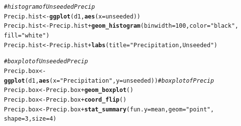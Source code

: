 \documentclass{article}\usepackage[]{graphicx}\usepackage[]{color}
\makeatletter
\newcommand{\hlnum}[1]{\textcolor[rgb]{0.686,0.059,0.569}{#1}}%
\newcommand{\hlstr}[1]{\textcolor[rgb]{0.192,0.494,0.8}{#1}}%
\newcommand{\hlcom}[1]{\textcolor[rgb]{0.678,0.584,0.686}{\textit{#1}}}%
\newcommand{\hlopt}[1]{\textcolor[rgb]{0,0,0}{#1}}%
\newcommand{\hlstd}[1]{\textcolor[rgb]{0.345,0.345,0.345}{#1}}%
\newcommand{\hlkwb}[1]{\textcolor[rgb]{0.69,0.353,0.396}{#1}}%
\newcommand{\hlkwc}[1]{\textcolor[rgb]{0.333,0.667,0.333}{#1}}%
\newcommand{\hlkwd}[1]{\textcolor[rgb]{0.737,0.353,0.396}{\textbf{#1}}}%
\newenvironment{kframe}{%
 \def\at@end@of@kframe{}%
 \ifinner\ifhmode%
  \def\at@end@of@kframe{\end{minipage}}%
  \begin{minipage}{\columnwidth}%
 \fi\fi%
 \def\FrameCommand##1{\hskip\@totalleftmargin \hskip-\fboxsep
 \colorbox{shadecolor}{##1}\hskip-\fboxsep
     \hskip-\linewidth \hskip-\@totalleftmargin \hskip\columnwidth}%
 \MakeFramed {\advance\hsize-\width
   \@totalleftmargin\z@ \linewidth\hsize
   \@setminipage}}%
 {\par\unskip\endMakeFramed%
 \at@end@of@kframe}
\newenvironment{knitrout}{}{} %
\makeatother
\begin{document}
\begin{knitrout}
\color{fgcolor}\begin{kframe}
\begin{alltt}
\hlcom{# histogram of Unseeded Precip}
\hlstd{Precip.hist} \hlkwb{<-} \hlkwd{ggplot}\hlstd{(d1,} \hlkwd{aes}\hlstd{(}\hlkwc{x} \hlstd{= unseeded))}
\hlstd{Precip.hist} \hlkwb{<-} \hlstd{Precip.hist} \hlopt{+} \hlkwd{geom_histogram}\hlstd{(}\hlkwc{binwidth} \hlstd{=} \hlnum{100}\hlstd{,}\hlkwc{color} \hlstd{=} \hlstr{"black"}\hlstd{,}
                                            \hlkwc{fill} \hlstd{=} \hlstr{"white"}\hlstd{)}
\hlstd{Precip.hist} \hlkwb{<-} \hlstd{Precip.hist} \hlopt{+} \hlkwd{labs}\hlstd{(}\hlkwc{title} \hlstd{=} \hlstr{"Precipitation, Unseeded"}\hlstd{)}

\hlcom{# boxplot of Unseeded Precip}
\hlstd{Precip.box} \hlkwb{<-} \hlkwd{ggplot}\hlstd{(d1,} \hlkwd{aes}\hlstd{(}\hlkwc{x} \hlstd{=} \hlstr{"Precipitation"}\hlstd{,}\hlkwc{y} \hlstd{= unseeded))} \hlcom{# boxplot of Precip}
\hlstd{Precip.box} \hlkwb{<-} \hlstd{Precip.box} \hlopt{+} \hlkwd{geom_boxplot}\hlstd{()}
\hlstd{Precip.box} \hlkwb{<-} \hlstd{Precip.box} \hlopt{+} \hlkwd{coord_flip}\hlstd{()}
\hlstd{Precip.box} \hlkwb{<-} \hlstd{Precip.box} \hlopt{+} \hlkwd{stat_summary}\hlstd{(}\hlkwc{fun.y} \hlstd{= mean,} \hlkwc{geom} \hlstd{=} \hlstr{"point"}\hlstd{,}
                                        \hlkwc{shape} \hlstd{=} \hlnum{3}\hlstd{,} \hlkwc{size} \hlstd{=} \hlnum{4}\hlstd{)}
\end{alltt}
\end{kframe}
\end{knitrout}
\end{document}
